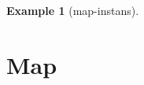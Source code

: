 \documentclass[oneside]{memoir}
\theoremstyle{definition}
\newtheorem{example}{Example}
\begin{document}
\begin{example}[\textsf{map}-instans]
      
      



\end{example}



\section{Map}
\end{document}
